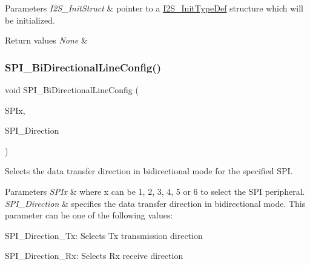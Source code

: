 \begin{DoxyParams}{Parameters}
{\em I2\+S\+\_\+\+Init\+Struct} & pointer to a \mbox{\hyperlink{struct_i2_s___init_type_def}{I2\+S\+\_\+\+Init\+Type\+Def}} structure which will be initialized. \\
\hline
\end{DoxyParams}

\begin{DoxyRetVals}{Return values}
{\em None} & \\
\hline
\end{DoxyRetVals}
\mbox{\label{group___s_p_i_ga166171c421fc51da7714723524d41b45}} 
\subsubsection{\texorpdfstring{S\+P\+I\+\_\+\+Bi\+Directional\+Line\+Config()}{SPI\_BiDirectionalLineConfig()}}
{\footnotesize\ttfamily void S\+P\+I\+\_\+\+Bi\+Directional\+Line\+Config (\begin{DoxyParamCaption}\item[{S\+P\+I\+\_\+\+Type\+Def $\ast$}]{S\+P\+Ix,  }\item[{uint16\+\_\+t}]{S\+P\+I\+\_\+\+Direction }\end{DoxyParamCaption})}



Selects the data transfer direction in bidirectional mode for the specified S\+PI. 


\begin{DoxyParams}{Parameters}
{\em S\+P\+Ix} & where x can be 1, 2, 3, 4, 5 or 6 to select the S\+PI peripheral. \\
\hline
{\em S\+P\+I\+\_\+\+Direction} & specifies the data transfer direction in bidirectional mode. This parameter can be one of the following values\+: \begin{DoxyItemize}
\item S\+P\+I\+\_\+\+Direction\+\_\+\+Tx\+: Selects Tx transmission direction \item S\+P\+I\+\_\+\+Direction\+\_\+\+Rx\+: Selects Rx receive direction \end{DoxyItemize}
\\
\hline
\end{DoxyParams}

